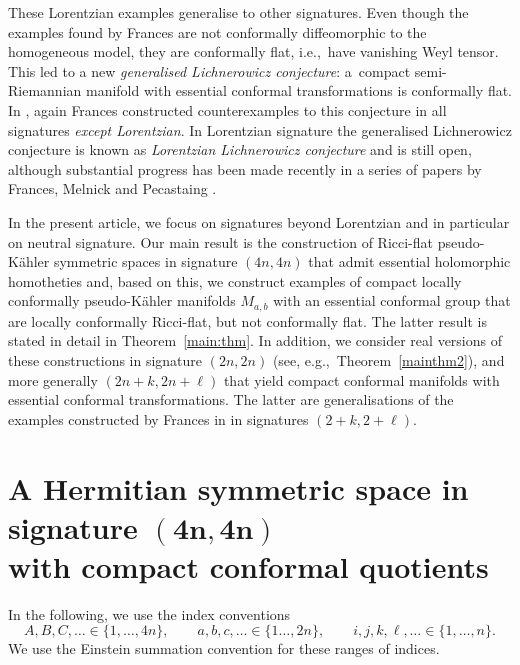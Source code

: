\documentclass[pdftex]{sigma}
\numberwithin{equation}{section}
\newcommand{\1}{\mathbf{1}}
\newcommand{\+}{\oplus}
\renewcommand{\=}{\equiv}
\begin{document}
These Lorentzian examples generalise to other signatures. Even though the examples found by Frances are not conformally diffeomorphic to the homogeneous model, they are conformally flat, i.e.,~have vanishing Weyl tensor. This led to a new {\em generalised Lichnerowicz conjecture}: a~compact semi-Riemannian manifold with essential conformal transformations is conformally flat. In \cite{frances12}, again Frances constructed counterexamples to this conjecture in all signatures {\em except Lorentzian}. In Lorentzian signature the generalised Lichnerowicz conjecture is known as {\em Lorentzian Lichnerowicz conjecture} and is still open, although substantial progress has been made recently in a series of papers by Frances, Melnick and Pecastaing \cite{FrancesMelnick21,MelnickPecastaing21,Pecastaing23,Pecastaing18}.

In the present article, we focus on signatures beyond Lorentzian and in particular on neutral signature. Our main result is the construction of Ricci-flat pseudo-K\"{a}hler symmetric spaces in signature $(4n,4n)$ that admit essential holomorphic homotheties and, based on this, we construct examples of compact locally conformally pseudo-K\"ahler manifolds $M_{a,b}$ with an essential conformal group that are locally conformally Ricci-flat, but not conformally flat. The latter result is stated in detail in Theorem~\ref{main:thm}. In addition, we consider real versions of these constructions in signature $(2n,2n)$ (see, e.g.,~Theorem~\ref{mainthm2}), and more generally $(2n+k,2n+\ell)$ that yield compact {conformal} manifolds with essential conformal transformations. The latter are generalisations of the examples constructed by Frances in \cite{frances12} in signatures $(2+k,2+\ell)$.

\section[A Hermitian symmetric space in signature (4n,4n) with compact conformal quotients]{A Hermitian symmetric space in signature $\boldsymbol{(4n,4n)}$ \\ with compact conformal quotients}
 In the following, we use the index conventions
\[A,B,C,\ldots \in \{1,\ldots, 4n\},\qquad a,b,c,\ldots\in \{1\ldots ,2n\},\qquad i,j,k,\ell,\ldots\in \{1,\ldots, n\}.\] We use the Einstein summation convention for these ranges of indices.
\end{document}

